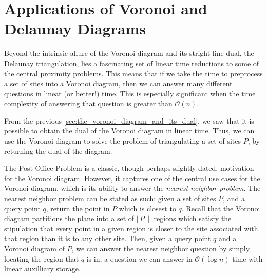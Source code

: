 \documentclass[12pt,twoside]{reedthesis}
\begin{document}
  \section{Applications of Voronoi and Delaunay Diagrams} %
  \label{sec:applications_of_voronoi_and_delaunay_diagrams}
    Beyond the intrinsic allure of the Voronoi diagram and its stright line dual, the Delaunay triangulation, lies a fascinating set of linear time reductions to some of the central proximity problems. This means that if we take the time to preprocess a set of sites into a Voronoi diagram, then we can answer many different questions in linear (or better!) time. This is especially significant when the time complexity of answering that question is greater than $\mathcal{O}(n)$.\par 

    From the previous \cref{sec:the_voronoi_diagram_and_its_dual}, we saw that it is possible to obtain the dual of the Voronoi diagram in linear time. Thus, we can use the Voronoi diagram to solve the problem of triangulating a set of sites $P$, by returning the dual of the diagram. 

    The Post Office Problem is a classic, though perhaps slightly dated, motivation for the Voronoi diagram. However, it captures one of the central use cases for the Voronoi diagram, which is its ability to answer the \emph{nearest neighbor problem}. The nearest neighbor problem can be stated as such: given a set of sites $P$, and a query point $q$, return the point in $P$ which is closest to $q$. Recall that the Voronoi diagram partitions the plane into a set of $\mid\,P\,\mid$ regions which satisfy the stipulation that every point in a given region is closer to the site associated with that region than it is to any other site. Then, given a query point $q$ and a Voronoi diagram of $P$, we can answer the nearest neighbor question by simply locating the region that $q$ is in, a question we can answer in $\mathcal{O}(\log n)$ time with linear auxilliary storage.\citep{shamos, p 214}\par
    
\end{document}
